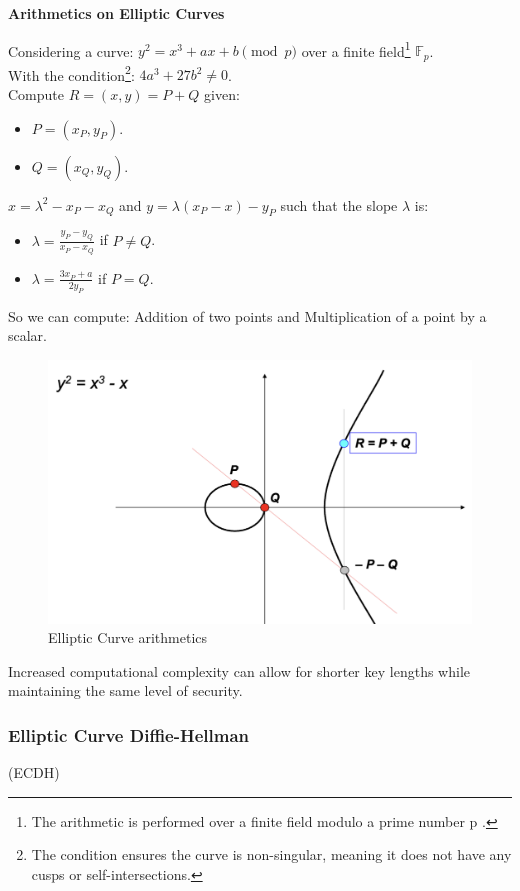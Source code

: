 \begin{center}
    \textbf{Arithmetics on Elliptic Curves}
\end{center}

Considering a curve: $y^2 = x^3 + ax + b \pmod{p}$ over a finite field\footnote{The arithmetic is performed over a finite field modulo a prime number  p .} $\mathbb{F}_p$.\\
With the condition\footnote{The condition ensures the curve is non-singular, meaning it does not have any cusps or self-intersections.}: $4a^3 + 27b^2 \neq 0$.\\
Compute $R=(x,y)=P+Q$ given:
\begin{itemize}
    \item $P=(x_P,y_P)$.
    \item $Q=(x_Q,y_Q)$.
\end{itemize}
$x= \lambda^2 - x_P - x_Q$ and $y= \lambda(x_P - x) - y_P$ such that the slope $\lambda$ is:
\begin{itemize}
    \item $\lambda = \frac{y_P - y_Q}{x_P - x_Q}$ if $P \neq Q$.
    \item $\lambda = \frac{3x_P + a}{2y_P}$ if $P = Q$.
\end{itemize}

\vspace{1cm}

So we can compute: Addition of two points and Multiplication of a point by a scalar.
\begin{figure}[H]
    \centering
    \includegraphics[width=0.5\linewidth]{Images/Cryptography/ec_arith.png}
    \caption{Elliptic Curve arithmetics}
\end{figure}

\begin{tcolorbox}[colback=blue!10!white, colframe=blue!50!white]
    Increased computational complexity can allow for shorter key lengths while maintaining the same level of security.
\end{tcolorbox}

\subsubsection{Elliptic Curve Diffie-Hellman}
\begin{center}
    (ECDH)
\end{center}

